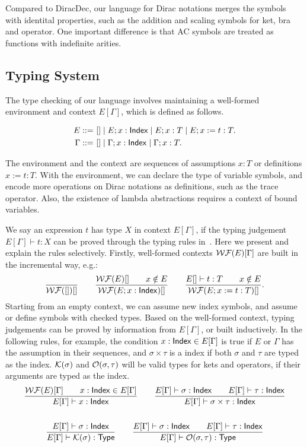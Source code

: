 \documentclass[runningheads]{llncs}
\begin{document}
Compared to DiracDec, our language for Dirac notations merges the symbols with identital properties, such as the addition and scaling symbols for ket, bra and operator. One important difference is that AC symbols are treated as functions with indefinite arities.



\subsection{Typing System}


The type checking of our language involves maintaining a well-formed environment and context $E[\Gamma]$, which is defined as follows.

\begin{definition}
    \begin{align*}
        E ::=\ & [] \mid E; x : \mathsf{Index} \mid E; x : T \mid E; x := t : T. \\
        \Gamma ::=\ & [] \mid \Gamma; x : \mathsf{Index} \mid \Gamma; x : T.
    \end{align*}
\end{definition}

The environment and the context are sequences of assumptions $x : T$ or definitions $x := t : T$.
With the environment, we can declare the type of variable symbols, and encode more operations on Dirac notations as definitions, such as the trace operator. Also, the existence of lambda abstractions requires a context of bound variables.


We say an expression $t$ has type $X$ in context $E[\Gamma]$, if the typing judgement $E[\Gamma] \vdash t : X$ can be proved through the typing rules in~. Here we present and explain the rules selectively. Firstly, well-formed contexts $\mathcal{WF}(E)[\Gamma]$ are built in the incremental way, e.g.:
\[
    \frac{}{\mathcal{WF}([])[]}
    \qquad
    \frac{\mathcal{WF}(E)[] \qquad x \notin E}{\mathcal{WF}(E; x : \mathsf{Index})[]}
    \qquad
    \frac{E[]\vdash t:T \qquad x \notin E}{\mathcal{WF}(E; x:=t:T)[]}.
\]
Starting from an empty context, we can assume new index symbols, and assume or define symbols with checked types. Based on the well-formed context, typing judgements can be proved by information from $E[\Gamma]$, or built inductively. In the following rules, for example, the condition $x : \mathsf{Index} \in E[\Gamma]$ is true if $E$ or $\Gamma$ has the assumption in their sequences, and $\sigma \times \tau$ is a index if both $\sigma$ and $\tau$ are typed as the index. $\mathcal{K}(\sigma)$ and $\mathcal{O}(\sigma, \tau)$ will be valid types for kets and operators, if their arguments are typed as the index.
\begin{gather*}
    \frac{\mathcal{WF}(E)[\Gamma] \qquad x : \mathsf{Index} \in E[\Gamma]}{E[\Gamma] \vdash x : \mathsf{Index}}
    \qquad
    \frac{E[\Gamma] \vdash \sigma : \mathsf{Index} \qquad E[\Gamma] \vdash \tau : \mathsf{Index}}{E[\Gamma] \vdash \sigma \times \tau : \mathsf{Index}} \\
    \\
    \frac{E[\Gamma] \vdash \sigma : \mathsf{Index}}{E[\Gamma] \vdash \mathcal{K}(\sigma) : \mathsf{Type}}
    \qquad
    \frac{E[\Gamma] \vdash \sigma : \mathsf{Index} \qquad E[\Gamma] \vdash \tau : \mathsf{Index}}{E[\Gamma] \vdash \mathcal{O}(\sigma, \tau) : \mathsf{Type}}
\end{gather*}
\end{document}
